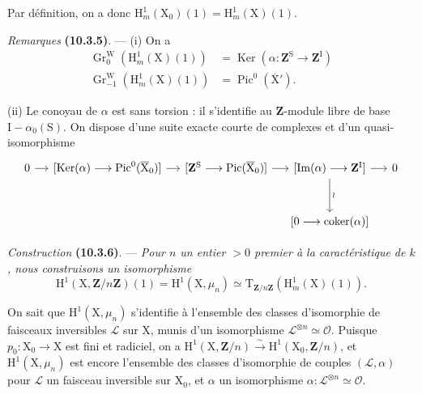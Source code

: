 \documentclass[11pt,leqno]{article}
\begin{document}
Par définition, on a donc \(\mathrm{H}^{1}_{m}(\mathrm{X}_0)(1)=\mathrm{H}^{1}_{m}(\mathrm{X})(1)\).

\textit{Remarques} \textbf{(10.3.5)}. — (i) On a
\[
\begin{aligned}
\operatorname{Gr}^{\mathrm{W}}_0(\mathrm{H}^{1}_{m}(\mathrm{X})(1))
  &=\operatorname{Ker}(\alpha:\mathbf{Z}^{\mathrm{S}}\to\mathbf{Z}^{\mathrm{I}})\\
\operatorname{Gr}^{\mathrm{W}}_{-1}(\mathrm{H}^{1}_{m}(\mathrm{X})(1))
  &=\operatorname{Pic}^{0}(\overline{\mathrm{X}}').
\end{aligned}
\]

(ii) Le conoyau de \(\alpha\) est sans torsion : il s’identifie au \(\mathbf{Z}\)-module libre de base \(\mathrm{I}-\alpha_0(\mathrm{S})\). On dispose d’une suite exacte courte de complexes et d’un quasi-isomorphisme
\[
\begin{tikzcd}[column sep=small,row sep=3em]
0 \arrow[r]
 & {[\operatorname{Ker}(\alpha)\longrightarrow
       \operatorname{Pic}^{0}(\overline{\mathrm{X}}_0)]} \arrow[r]
 & {[\mathbf{Z}^{\mathrm{S}}\longrightarrow
       \operatorname{Pic}(\overline{\mathrm{X}}_0)]} \arrow[r]
 & {[\operatorname{Im}(\alpha)\longrightarrow\mathbf{Z}^{\mathrm{I}}]}
       \arrow[r] \arrow[d,"\wr"]
 & 0 \\
 & & & {[0\longrightarrow\operatorname{coker}(\alpha)]} &
\end{tikzcd}
\]

\textit{Construction} \textbf{(10.3.6)}. — \textit{Pour \(n\) un entier \(>0\) premier à la caractéristique de \(k\), nous construisons un isomorphisme}
\[
\mathrm{H}^{1}(\mathrm{X},\mathbf{Z}/n\mathbf{Z})(1)
=\mathrm{H}^{1}(\mathrm{X},\mu_n)
\simeq
\mathrm{T}_{\mathbf{Z}/n\mathbf{Z}}(\mathrm{H}^{1}_{m}(\mathrm{X})(1)).
\]

On sait que \(\mathrm{H}^{1}(\mathrm{X},\mu_n)\) s’identifie à l’ensemble des classes d’isomorphie de faisceaux inversibles \(\mathcal{L}\) sur \(\mathrm{X}\), munis d’un isomorphisme \(\mathcal{L}^{\otimes n}\simeq\mathcal{O}\). Puisque \(p_0:\mathrm{X}_0\to\mathrm{X}\) est fini et radiciel, on a \(\mathrm{H}^{1}(\mathrm{X},\mathbf{Z}/n)\xrightarrow{\sim}\mathrm{H}^{1}(\mathrm{X}_0,\mathbf{Z}/n)\), et \(\mathrm{H}^{1}(\mathrm{X},\mu_n)\) est encore l’ensemble des classes d’isomorphie de couples \((\mathcal{L},\alpha)\) pour \(\mathcal{L}\) un faisceau inversible sur \(\mathrm{X}_0\), et \(\alpha\) un isomorphisme \(\alpha:\mathcal{L}^{\otimes n}\simeq\mathcal{O}\).
\end{document}
